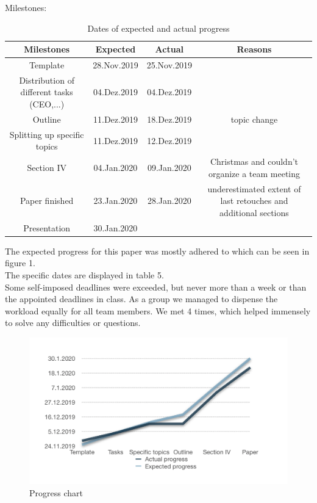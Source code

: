 Milestones:
\begin{table}[H]
\caption{Dates of expected and actual progress}
\centering
\begin{tabular}{cccc}
\toprule
Milestones & Expected & Actual& Reasons\\
\midrule
Template & 28.Nov.2019 & 25.Nov.2019&\\
Distribution of different tasks (CEO,...) & 04.Dez.2019 &04.Dez.2019&\\
Outline & 11.Dez.2019& 18.Dez.2019& topic change\\
Splitting up specific topics & 11.Dez.2019&12.Dez.2019\\
Section IV & 04.Jan.2020&09.Jan.2020& Christmas and couldn't organize a team meeting\\
Paper finished& 23.Jan.2020& 28.Jan.2020& underestimated extent of last retouches and additional sections\\
Presentation & 30.Jan.2020& &\\
\bottomrule
\end{tabular}
\end{table}
The expected progress for this paper was mostly adhered to which can be seen in figure 1. \\
The specific dates are displayed in table 5.\\
Some self-imposed deadlines were exceeded, but never more than a week or than the appointed deadlines in class. As a group we managed to dispense the workload equally for all team members. We met 4 times, which helped immensely to solve any difficulties or questions. 

\begin{figure}[H]
\centering
\includegraphics[scale=0.5]{Progress_chart}
\caption{Progress chart}
\end{figure}

